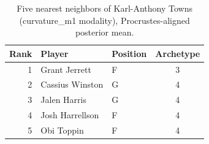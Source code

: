\begin{table}[htbp]
  \centering\small
  \begin{tabular}{rllc}
    \toprule
    Rank & Player & Position & Archetype \\
    \midrule
    1 & Grant Jerrett & F & 3 \\
    2 & Cassius Winston & G & 4 \\
    3 & Jalen Harris & G & 4 \\
    4 & Josh Harrellson & F & 4 \\
    5 & Obi Toppin & F & 4 \\
    \bottomrule
  \end{tabular}
  \caption{Five nearest neighbors of Karl-Anthony Towns (curvature_m1 modality), Procrustes-aligned posterior mean.}
  \label{tab:Karl_Anthony_Towns_neighbors_curvature_m1}
\end{table}

